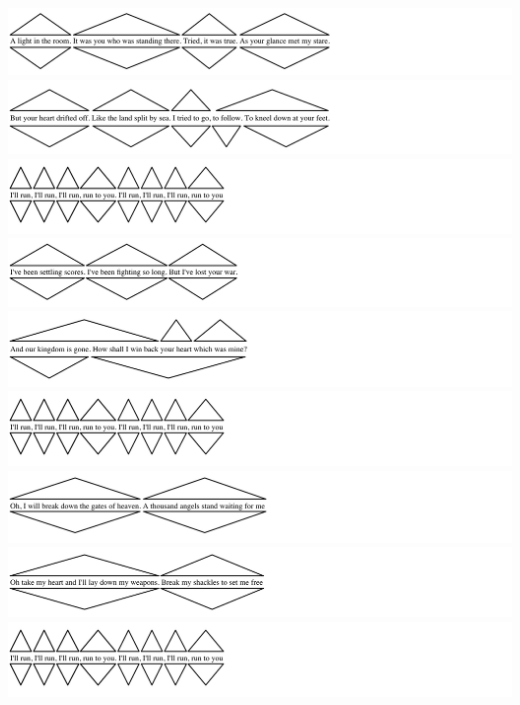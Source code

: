 \includegraphics[width=\textwidth]{resources/trees/rty-s1-1.png}
\includegraphics[width=\textwidth]{resources/trees/rty-s1-2.png}
\includegraphics[width=\textwidth]{resources/trees/rty-r.png}
\includegraphics[width=\textwidth]{resources/trees/rty-s2-1.png}
\includegraphics[width=\textwidth]{resources/trees/rty-s2-2.png}
\includegraphics[width=\textwidth]{resources/trees/rty-r.png}
\includegraphics[width=\textwidth]{resources/trees/rty-br-1.png}
\includegraphics[width=\textwidth]{resources/trees/rty-br-2.png}
\includegraphics[width=\textwidth]{resources/trees/rty-r.png}

